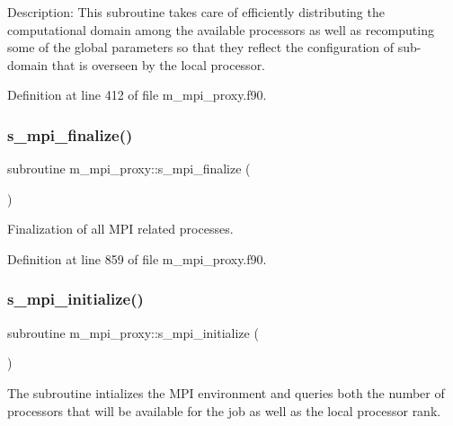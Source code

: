 Description\+: This subroutine takes care of efficiently distributing the computational domain among the available processors as well as recomputing some of the global parameters so that they reflect the configuration of sub-\/domain that is overseen by the local processor. 



Definition at line 412 of file m\+\_\+mpi\+\_\+proxy.\+f90.

\mbox{\label{namespacem__mpi__proxy_a43fbda10c02ec8bc1fc572c83090f2e5}} 
\subsubsection{\texorpdfstring{s\+\_\+mpi\+\_\+finalize()}{s\_mpi\_finalize()}}
{\footnotesize\ttfamily subroutine m\+\_\+mpi\+\_\+proxy\+::s\+\_\+mpi\+\_\+finalize (\begin{DoxyParamCaption}{ }\end{DoxyParamCaption})}



Finalization of all M\+PI related processes. 



Definition at line 859 of file m\+\_\+mpi\+\_\+proxy.\+f90.

\mbox{\label{namespacem__mpi__proxy_a9bc4c617505152d3cc553e5bc25c1ee1}} 
\subsubsection{\texorpdfstring{s\+\_\+mpi\+\_\+initialize()}{s\_mpi\_initialize()}}
{\footnotesize\ttfamily subroutine m\+\_\+mpi\+\_\+proxy\+::s\+\_\+mpi\+\_\+initialize (\begin{DoxyParamCaption}{ }\end{DoxyParamCaption})}



The subroutine intializes the M\+PI environment and queries both the number of processors that will be available for the job as well as the local processor rank. 



